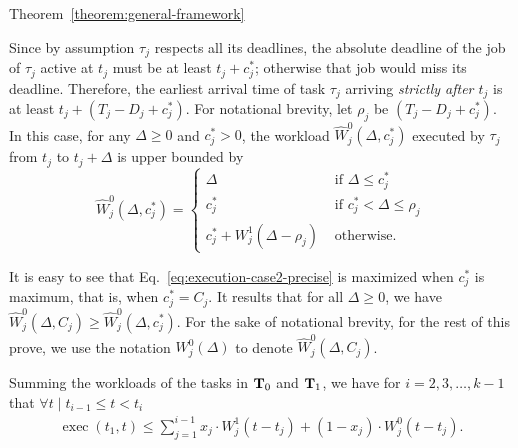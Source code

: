 \begin{appProof}{Theorem~\ref{theorem:general-framework}}
\begin{itemize}
  Since by assumption $\tau_j$ respects all its deadlines, the absolute deadline of the job of $\tau_j$ active at $t_j$ must be at least $t_j + c_j^*$; otherwise that job would miss its
  deadline. Therefore, the earliest arrival time of task $\tau_j$
  arriving \emph{strictly after $t_j$} is at least $t_j + (T_j-D_j +
  c_j^*)$. For notational brevity, let $\rho_j$ be
  $(T_j-D_j + c_j^*)$. In this case, for any $\Delta \geq 0$ and $c_j^* > 0$, the workload $\widehat{W}_j^0(\Delta, c_j^*)$ executed by $\tau_j$ from $t_j$ to $t_j+\Delta$ is upper bounded by
  \begin{equation}
  \label{eq:execution-case2-precise}
  \widehat{W}_j^0(\Delta, c_j^*)=
  \begin{cases}
    \Delta & \mbox{ if } \Delta \leq  c_j^*\\
    c_j^* & \mbox{ if } c_j^* < \Delta \leq  \rho_j\\
   c_j^* + W_j^1(\Delta-\rho_j) & \mbox{ otherwise}.
  \end{cases}
\end{equation}

It is easy to see that Eq.~\eqref{eq:execution-case2-precise} is maximized when $c_j^*$ is maximum, that is, when $c_j^* = C_j$. It results that for all $\Delta \geq 0$, we have $\widehat{W}_j^0(\Delta, C_j) \geq
\widehat{W}_j^0(\Delta, c_j^*)$. For the sake of notational brevity, for the rest of this prove, we use the notation $W_j^0(\Delta)$ to denote $\widehat{W}_j^0(\Delta, C_j)$.

\end{itemize}

Summing the workloads of the tasks in ${\bf T}_0$ and ${\bf T}_1$, we have
for $i=2,3,\ldots,k-1$ that $\forall t \mid t_{i-1} \leq t < t_i$
\begin{align}
\label{eq:exec_time}
\operatorname{exec}(t_1, t) \leq \sum_{j=1}^{i-1} x_j\cdot W_j^1(t-t_j)  + (1-x_j)\cdot W_j^0(t-t_j).
\end{align}


\end{appProof}
